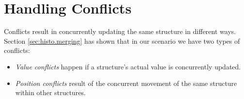 
\section{Handling Conflicts}

Conflicts result in concurrently updating the same structure in different ways.
Section \ref{sec:histo.merging} has shown that in our scenario we have two types of conflicts:

\begin{itemize}
\item \emph{Value conflicts} happen if a structure's actual value is concurrently updated.
\item \emph{Position conflicts} result of the concurrent movement of the same structure within other structures.
\end{itemize}

